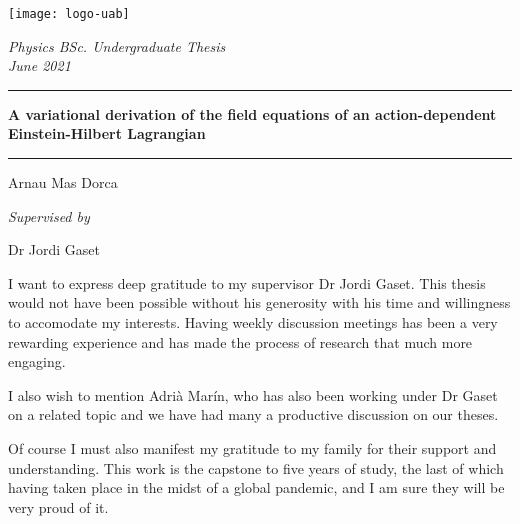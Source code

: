 \documentclass[12pt, oneside]{book}
\title{}
\author{Arnau Mas}
\date{}
\begin{document}
\begin{titlepage}
	\centering \sffamily

	\vspace*{2cm}

	\texttt{[image: logo-uab]}

	\vspace{2cm}

	{\Large \itshape Physics BSc. Undergraduate Thesis} \\
	{\large \itshape June 2021}

	\vspace{10pt}
	\hrule
	\vspace{10pt}
	{\bfseries \Large A variational derivation of the field equations of an action-dependent
	Einstein-Hilbert Lagrangian}

	\vspace{10pt}
	\hrule		
	\vspace{2cm}

	{\Large Arnau Mas Dorca}

	\vspace{1cm}
	{\large \itshape Supervised by}

	{\Large Dr Jordi Gaset}
\end{titlepage}

% 

\pagestyle{plain}
\frontmatter
\hspace{0pt}
\vfill

\begin{itshape}
	I want to express deep gratitude to my supervisor Dr Jordi Gaset. This thesis would not
	have been possible without his generosity with his time and willingness to accomodate
	my interests. Having weekly discussion meetings has been a very rewarding experience and
	has made the process of research that much more engaging. 

	I also wish to mention Adrià Marín, who has also been working under Dr Gaset on a
	related topic and we have had many a productive discussion on our theses. 

	Of course I must also manifest my gratitude to my family for their support and
	understanding. This work is the capstone to five years of study, the last of which
	having taken place in the midst of a global pandemic, and I am sure they will be very
	proud of it. 
\end{itshape}

\vfill
\hspace{0pt}
\end{document}
